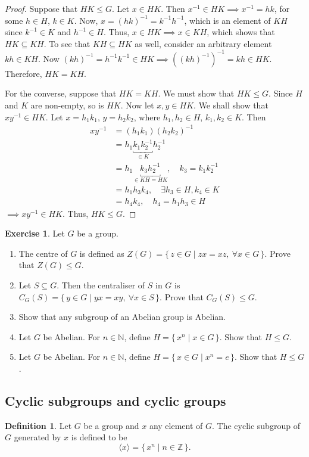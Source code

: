 \documentclass[svgnames]{article}
\theoremstyle{definition}
\newtheorem{Definition}[Definition]{Definition}
\newtheorem{Exercise}{Exercise}[section]
\theoremstyle{remark}
\newcommand{\newterm}[1]{{\color{alertcolor} #1}}
\begin{document}
\begin{proof}
Suppose that $HK \le G$. Let $x \in HK$. Then $x^{-1} \in HK \implies x^{-1} = hk$, for some $h \in H$, $k \in K$. Now, $x = (hk)^{-1} = k^{-1} h^{-1}$, which is an element of $KH$ since $k^{-1} \in K$ and $h^{-1} \in H$. Thus, $x \in HK \implies x \in KH$, which shows that $HK \subseteq KH$. To see that $KH \subseteq HK$ as well, consider an arbitrary element $kh \in KH$. Now $(kh)^{-1} = h^{-1}k^{-1} \in HK \implies ((kh)^{-1})^{-1} = kh \in HK$.  Therefore, $HK = KH$.

For the converse, suppose that $HK = KH$. We must show that $HK \le G$. Since $H$ and $K$ are non-empty, so is $HK$. Now let $x, y \in HK$. We shall show that $xy^{-1} \in HK$. Let $x = h_1 k_1$, $y = h_2 k_2$, where $h_1, h_2 \in H$, $k_1, k_2 \in K$. Then
\begin{align*}
xy^{-1} & = (h_1k_1)(h_2k_2)^{-1}\\
	& = h_1 \underbracket{k_1 k_2^{-1}}_{\in K} h_2^{-1}\\
	& = h_1 \underbracket{k_3 h_2^{-1}}_{\in KH = HK}, \quad k_3 = k_1 k_2^{-1}\\
	& = h_1 h_3 k_4, \quad \exists h_3 \in H, k_4 \in K\\
	&= h_4 k_4, \quad h_4 = h_1 h_3 \in H
\end{align*}
$\implies xy^{-1} \in HK$. Thus, $HK \le G$.
\end{proof}
\begin{Exercise}
Let $G$ be a group.
\begin{enumerate}
\item The \newterm{centre}\label{def:Centre} of $G$ is defined as $Z(G) = \{\, z \in G \mid zx = xz,\ \forall x \in G \,\}$. Prove that $Z(G) \le G$.
\item Let $S \subseteq G$. Then the \newterm{centraliser}\label{def:Centraliser} of $S$ in $G$ is $C_G(S) = \{\, y \in G \mid yx = xy,\ \forall x \in S \,\}$. Prove that $C_G(S) \le G$.
\item Show that any subgroup of an Abelian group is Abelian.
\item Let $G$ be Abelian. For $n \in \mathbb N$, define $H = \{\, x^n \mid x \in G \,\}$. Show that $H \le G$.
\item Let $G$ be Abelian. For $n \in \mathbb N$, define $H = \{\,  x \in G \mid x^n = e\,\}$. Show that $H \le G$.
\end{enumerate}
\end{Exercise}

\subsection{Cyclic subgroups and cyclic groups}\label{subsec:CycGroups}
\begin{Definition}\label{def:CycSubgroup}
Let $G$ be a group and $x$ any element of $G$. The \newterm{cyclic subgroup} of $G$ \newterm{generated} by $x$ is defined to be
\begin{equation*}
\langle x \rangle = \{\, x^n \mid n \in \mathbb Z \,\}.
\end{equation*}
\end{Definition}
\end{document}
